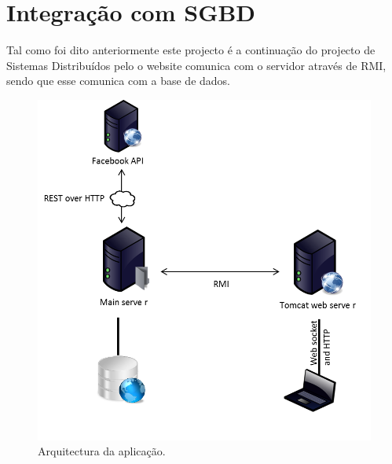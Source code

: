 \documentclass[a4paper, 12pt]{article}
\begin{document}
\section{Integração com SGBD}
\indent \indent Tal como foi dito anteriormente este projecto é a continuação do projecto de Sistemas Distribuídos pelo o website comunica com o servidor através de RMI, sendo que esse comunica com a base de dados.

\begin{figure}[h]
    \includegraphics[keepaspectratio=true, height=0.7\textheight]{arch}
    \caption{Arquitectura da aplicação.}
\end{figure}
\cleardoublepage
\end{document}
